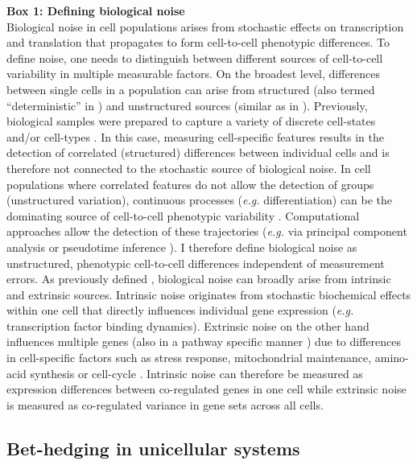 \begin{Comment}
\small
\textbf{Box 1: Defining biological noise}\\
Biological noise in cell populations arises from stochastic effects on transcription and translation that propagates to form cell-to-cell phenotypic differences. To define noise, one needs to distinguish between different sources of cell-to-cell variability in multiple measurable factors. On the broadest level, differences between single cells in a population can arise from structured (also termed “deterministic” in \citep{Marusyk2012}) and unstructured sources (similar as in \citep{Singer2014a}). Previously, biological samples were prepared to capture a variety of discrete cell-states and/or cell-types \todo{[refs]}.  In this case, measuring cell-specific features results in the detection of correlated (structured) differences between individual cells and is therefore not connected to the stochastic source of biological noise. In cell populations where correlated features do not allow the detection of groups (unstructured variation), continuous processes (\emph{e.g.} differentiation) can be the dominating source of cell-to-cell phenotypic variability \todo{[refs]}. Computational approaches allow the detection of these trajectories (\emph{e.g.} via principal component analysis or pseudotime inference \citep{Trapnell2014, Angerer2015}). I therefore define biological noise as unstructured, phenotypic cell-to-cell differences independent of measurement errors. 
As previously defined \citep{Elowitz2002}, biological noise can broadly arise from intrinsic and extrinsic sources. Intrinsic noise originates from stochastic biochemical effects within one cell that directly influences individual gene expression \citep{Swain2002} (\emph{e.g.} transcription factor binding dynamics). Extrinsic noise on the other hand influences multiple genes (also in a pathway specific manner \citep{Raser2010}) due to differences in cell-specific factors such as stress response, mitochondrial maintenance, amino-acid synthesis \citep{Stewart-Ornstein2012} or cell-cycle \citep{Zopf2013}. Intrinsic noise can therefore be measured as expression differences between co-regulated genes in one cell while extrinsic noise is measured as co-regulated variance in gene sets across all cells.\\
\end{Comment}

\subsection{Bet-hedging in unicellular systems}

